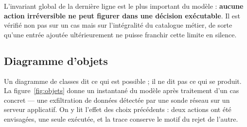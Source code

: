 L'invariant global de la derni\`ere ligne est le plus important du mod\`ele :
\textbf{aucune action irr\'eversible ne peut figurer dans une d\'ecision ex\'ecutable}.
Il est v\'erifi\'e non pas sur un cas mais sur l'int\'egralit\'e du catalogue m\'etier, de
sorte qu'une entr\'ee ajout\'ee ult\'erieurement ne puisse franchir cette limite en
silence.

\subsection{Diagramme d'objets}
Un diagramme de classes dit ce qui est possible ; il ne dit pas ce qui se produit.
La figure~\ref{fig:objets} donne un instantan\'e du mod\`ele apr\`es traitement d'un
cas concret --- une exfiltration de donn\'ees d\'etect\'ee par une sonde r\'eseau sur un
serveur applicatif. On y lit l'effet des choix pr\'ec\'edents : deux actions ont \'et\'e
envisag\'ees, une seule ex\'ecut\'ee, et la trace conserve le motif du rejet de l'autre.


